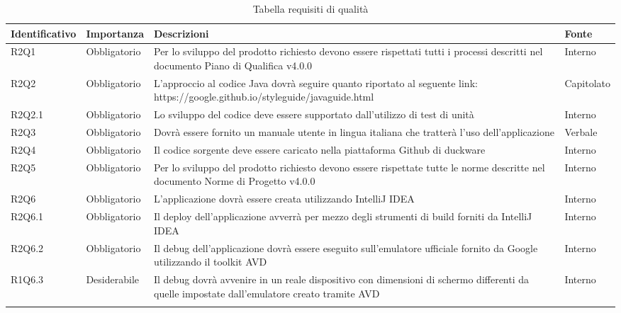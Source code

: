 \begin{center}
	\renewcommand{\arraystretch}{1.5}
	\begin{longtable}{  >{\RaggedRight}p{2.5cm}  
						>{\RaggedRight}p{2.1cm} 
						>{\RaggedRight}p{7cm}  
						>{\RaggedRight}p{1.7cm} 
						}
		\rowcolor{tableHeadYellow}

		\textbf{Identificativo}   & \textbf{Importanza} & \textbf{Descrizioni} & \textbf{Fonte} \\ 
		\endhead

		R2Q1   & Obbligatorio & Per lo sviluppo del prodotto richiesto devono essere rispettati tutti i processi descritti nel documento Piano di Qualifica v4.0.0 & Interno    \\
		R2Q2   & Obbligatorio & L'approccio al codice Java dovrà seguire quanto riportato al seguente link: https://google.github.io/styleguide/javaguide.html                & Capitolato \\
		R2Q2.1 & Obbligatorio & Lo sviluppo del codice deve essere supportato dall'utilizzo di test di unità                                                        & Interno    \\  
		R2Q3   & Obbligatorio & Dovrà essere fornito un manuale utente in lingua italiana che tratterà l'uso dell'applicazione                                      & Verbale    \\  
		R2Q4   & Obbligatorio & Il codice sorgente deve essere caricato nella piattaforma Github di duckware                                                        & Interno    \\  
		R2Q5   & Obbligatorio & Per lo sviluppo del prodotto richiesto devono essere rispettate tutte le norme descritte nel documento Norme di Progetto v4.0.0 & Interno    \\  
		R2Q6   & Obbligatorio & L'applicazione dovrà essere creata utilizzando IntelliJ IDEA                                                                               & Interno               \\  
		R2Q6.1 & Obbligatorio & Il deploy dell'applicazione avverrà per mezzo degli strumenti di build forniti da IntelliJ IDEA                                            & Interno               \\  
		R2Q6.2 & Obbligatorio & Il debug dell'applicazione dovrà essere eseguito sull'emulatore ufficiale fornito da Google utilizzando il toolkit AVD                        & Interno               \\  
		R1Q6.3 & Desiderabile & Il debug dovrà avvenire in un reale dispositivo con dimensioni di schermo differenti da quelle impostate dall'emulatore creato tramite AVD & Interno               \\

		\rowcolor{white}
		\caption{Tabella requisiti di qualità}
	\end{longtable}
\end{center}
\clearpage
